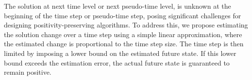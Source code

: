 
The solution at next time level or next pseudo-time level, is unknown at the beginning of the time step or pseudo-time step, posing significant challenges for designing positivity-preserving algorithms. 
To address this, we propose estimating the solution change over a time step using a simple linear approximation, where the estimated change is proportional to the time step size. The time step is then limited by imposing a lower bound on the estimated future state.
If this lower bound exceeds the estimation error, the actual future state is guaranteed to remain positive.

